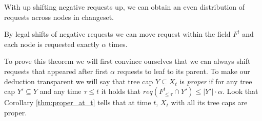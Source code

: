 With up shifting negative requests up, we can obtain an even distribution of 
requests across nodes in changeset.
\begin{theorem}
By legal shifts of negative requests we can move request within the field $F^t$ 
and each node is requested exactly $\alpha$ times.
\label{thm:legal_shifting_up}
\end{theorem}
To prove this theorem we will first convince ourselves that we can always 
shift requests that appeared after first $\alpha$ requests to leaf to its 
parent. To make our deduction transparent we will say that tree cap $Y 
\subseteq X_t$ is \textit{proper} if for any tree cap $Y' \subseteq Y$ and any 
time $\tau \leq t$ it holds that $req(F^t_{\leq \tau} \cap Y') \leq |Y'| \cdot 
\alpha$. Look that Corollary \ref{thm:proper_at_t} tells that at time $t$, 
$X_t$ with all its tree caps are proper.

